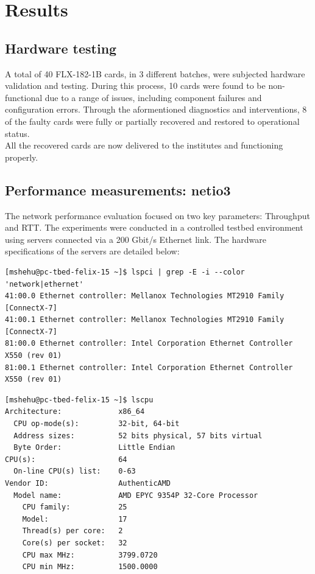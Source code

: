 \chapter{Results}

\section{Hardware testing}

A total of 40 FLX-182-1B cards, in 3 different batches, were subjected hardware validation and testing. During this process, 10 cards were found to be non-functional due to a range of issues, including component failures and configuration errors. Through the aformentioned diagnostics and interventions, 8 of the faulty cards were fully or partially recovered and restored to operational status.\\
All the recovered cards are now delivered to the institutes and functioning properly.

\section{Performance measurements: netio3}
\label{sec:netio3-perf}
The network performance evaluation focused on two key parameters: Throughput and \ac{RTT}. The experiments were conducted in a controlled testbed environment using servers connected via a 200 Gbit/s Ethernet link. The hardware specifications of the servers are detailed below:

\clearpage
\begin{lstlisting}[caption={Network interface information}, label={lst:network}]
[mshehu@pc-tbed-felix-15 ~]$ lspci | grep -E -i --color 'network|ethernet'
41:00.0 Ethernet controller: Mellanox Technologies MT2910 Family [ConnectX-7]
41:00.1 Ethernet controller: Mellanox Technologies MT2910 Family [ConnectX-7]
81:00.0 Ethernet controller: Intel Corporation Ethernet Controller X550 (rev 01)
81:00.1 Ethernet controller: Intel Corporation Ethernet Controller X550 (rev 01)
\end{lstlisting}

\begin{lstlisting}[caption={CPU information}, label={lst:cpu}, float=htbp]
[mshehu@pc-tbed-felix-15 ~]$ lscpu
Architecture:             x86_64
  CPU op-mode(s):         32-bit, 64-bit
  Address sizes:          52 bits physical, 57 bits virtual
  Byte Order:             Little Endian
CPU(s):                   64
  On-line CPU(s) list:    0-63
Vendor ID:                AuthenticAMD
  Model name:             AMD EPYC 9354P 32-Core Processor
    CPU family:           25
    Model:                17
    Thread(s) per core:   2
    Core(s) per socket:   32
    CPU max MHz:          3799.0720
    CPU min MHz:          1500.0000
\end{lstlisting}


